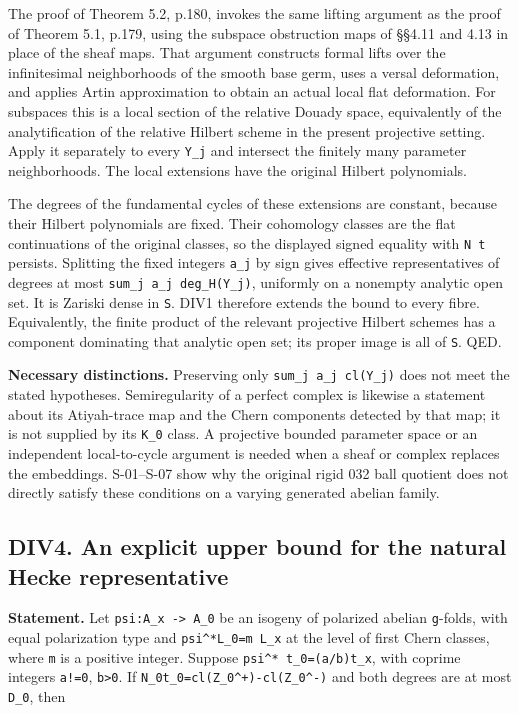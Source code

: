 \documentclass[11pt,a4paper]{article}
\theoremstyle{definition}
\begin{document}
The proof of Theorem 5.2, p.180, invokes the same lifting argument as
the proof of Theorem 5.1, p.179, using the subspace obstruction maps of
§§4.11 and 4.13 in place of the sheaf maps. That argument constructs
formal lifts over the infinitesimal neighborhoods of the smooth base
germ, uses a versal deformation, and applies Artin approximation to
obtain an actual local flat deformation. For subspaces this is a local
section of the relative Douady space, equivalently of the
analytification of the relative Hilbert scheme in the present projective
setting. Apply it separately to every \texttt{Y\_j} and intersect the
finitely many parameter neighborhoods. The local extensions have the
original Hilbert polynomials.

The degrees of the fundamental cycles of these extensions are constant,
because their Hilbert polynomials are fixed. Their cohomology classes
are the flat continuations of the original classes, so the displayed
signed equality with \texttt{N\ t} persists. Splitting the fixed
integers \texttt{a\_j} by sign gives effective representatives of
degrees at most \texttt{sum\_j\ \textbar{}a\_j\textbar{}\ deg\_H(Y\_j)},
uniformly on a nonempty analytic open set. It is Zariski dense in
\texttt{S}. DIV1 therefore extends the bound to every fibre.
Equivalently, the finite product of the relevant projective Hilbert
schemes has a component dominating that analytic open set; its proper
image is all of \texttt{S}. QED.

\textbf{Necessary distinctions.} Preserving only
\texttt{sum\_j\ a\_j\ cl(Y\_j)} does not meet the stated hypotheses.
Semiregularity of a perfect complex is likewise a statement about its
Atiyah-trace map and the Chern components detected by that map; it is
not supplied by its \texttt{K\_0} class. A projective bounded parameter
space or an independent local-to-cycle argument is needed when a sheaf
or complex replaces the embeddings. S-01--S-07 show why the original
rigid 032 ball quotient does not directly satisfy these conditions on a
varying generated abelian family.

\subsection{DIV4. An explicit upper bound for the natural Hecke
representative}\label{div4.-an-explicit-upper-bound-for-the-natural-hecke-representative}

\textbf{Statement.} Let \texttt{psi:A\_x\ -\textgreater{}\ A\_0} be an
isogeny of polarized abelian \texttt{g}-folds, with equal polarization
type and \texttt{psi\^{}*L\_0=m\ L\_x} at the level of first Chern
classes, where \texttt{m} is a positive integer. Suppose
\texttt{psi\^{}*\ t\_0=(a/b)t\_x}, with coprime integers \texttt{a!=0},
\texttt{b\textgreater{}0}. If
\texttt{N\_0t\_0=cl(Z\_0\^{}+)-cl(Z\_0\^{}-)} and both degrees are at
most \texttt{D\_0}, then
\end{document}
